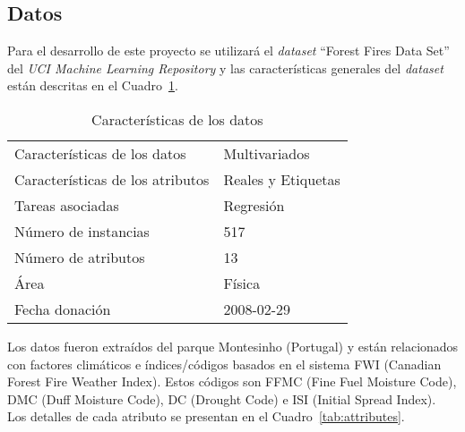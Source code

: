 \documentclass[spanish]{article}
\begin{document}
	\subsection{Datos}
    
  	Para el desarrollo de este proyecto se utilizará el \emph{dataset} ``Forest Fires Data Set'' del 
    \emph{UCI Machine Learning Repository} \cite{cortez} y las características generales del \emph{dataset} 
    están descritas en el Cuadro~\ref{tab:features}.
    
    \clearpage
    
    \begin{table}[!ht]
    	\centering            
      \caption{Características de los datos}
    	\begin{tabular}{ll} 
      	\hline
      	Características de los datos & Multivariados \\              			    				
        Características de los atributos & Reales y Etiquetas \\
        Tareas asociadas & Regresión \\
        Número de instancias & 517 \\
        Número de atributos & 13 \\
        Área & Física \\
        Fecha donación & 2008-02-29 \\
        \hline
    	\end{tabular}            
      \label{tab:features}
    \end{table}
      
    Los datos fueron extraídos del parque Montesinho (Portugal) y están relacionados con factores climáticos 
    e índices/códigos basados en el sistema FWI (Canadian Forest Fire Weather Index). Estos códigos son
    FFMC (Fine Fuel Moisture Code), DMC (Duff Moisture Code), DC (Drought Code) e ISI (Initial Spread Index).
    Los detalles de cada atributo se presentan en el Cuadro~\ref{tab:attributes}.
    
\end{document}

